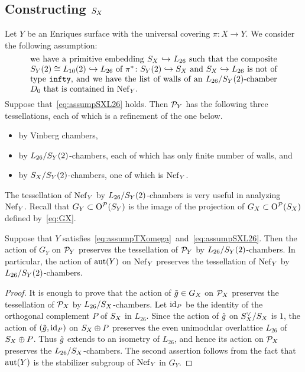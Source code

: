 \documentclass{amsart}
\numberwithin{procedure}{section}
\begin{document}
\subsection{Constructing $S_{X}$}\label{subsec:construction}
%
Let $Y$ be an Enriques surface 
with the universal covering $\pi\colon X\to Y$.
We consider the following assumption:
%
\begin{equation}\label{eq:assumpSXL26}
\parbox{10.5cm}{
we have a primitive embedding $\SX\inj L_{26}$
such that  the composite $ \SY(2)\cong L_{10}(2) \inj L_{26}$ of 
$\pi\sp*\colon \SY(2)\inj \SX$ and
$\SX\inj L_{26}$ 
is not of type {\tt infty}, and we have the list of walls 
of an $\LSY$-chamber $D_0$ that is contained in $\NefY$.}
\end{equation}
%
Suppose that~\eqref{eq:assumpSXL26} holds.
Then  $\mathord{\mathcal P}_Y$
has the following three tessellations,
each of which  is a refinement of the one below.
%
\begin{itemize}
\item by Vinberg chambers, 
\item by $L_{26}/S_Y(2)$-chambers, each of which has only finite number of walls, and 
\item by $S_{X}/S_{Y}(2)$-chambers, one of which is $\mathord{\rm Nef}_{Y}$.
\end{itemize}
%
The tessellation of 
$\mathord{\rm Nef}_{Y}$ by $L_{26}/S_Y(2)$-chambers is very useful in analyzing  $\mathord{\rm Nef}_{Y}$.
Recall that $G_Y\subset \mathord{\mathrm{O}}^{\mathord{\mathcal P}}(S_{Y})$ is the image of the projection of $G_X\subset \mathord{\mathrm{O}}^{\mathord{\mathcal P}}(S_{X})$
defined by~\eqref{eq:GX}.
%
\begin{proposition}\label{prop:tressellationpreserve}
Suppose that $Y$ satisfies~\eqref{eq:assumpTXomega}~and~\eqref{eq:assumpSXL26}. 
Then the action of $G_Y$ on
$\mathord{\mathcal P}_Y$ preserves the  tessellation of $\mathord{\mathcal P}_Y$ by $L_{26}/S_Y(2)$-chambers.
In particular, the action of $\mathord{\rm{aut}}(Y)$ 
on $\mathord{\rm Nef}_{Y}$ preserves the  tessellation of $\mathord{\rm Nef}_{Y}$ by $L_{26}/S_Y(2)$-chambers.
\end{proposition}
%
\begin{proof}
It is enough to prove that 
the action of $\tilde{g}\in G_X$ on
$\mathord{\mathcal P}_X$ preserves the  tessellation of $\mathord{\mathcal P}_X$ by $L_{26}/S_{X}$-chambers.
Let  $\mathord{\mathrm{id}}_P$ be the identity  of the orthogonal complement $P$ of $S_{X}$ in $L_{26}$.
Since
 the action of $\tilde{g}$ on $S_{X}\sp{\vee}/S_{X}$ is  $1$,
the action of $(\tilde{g}, \mathord{\mathrm{id}}_P)$ on $S_{X}\oplus P$
 preserves the even unimodular overlattice $L_{26}$ of $S_{X}\oplus P$.
 Thus
$\tilde{g}$ extends to
 an isometry of $L_{26}$, and hence
 its action on $\mathord{\mathcal P}_X$
  preserves the $L_{26}/S_{X}$-chambers.
  The second assertion follows from the fact that $\mathord{\rm{aut}}(Y)$ is 
  the stabilizer subgroup of $\mathord{\rm Nef}_{Y}$ in $G_Y$.
  \end{proof}
\end{document}
